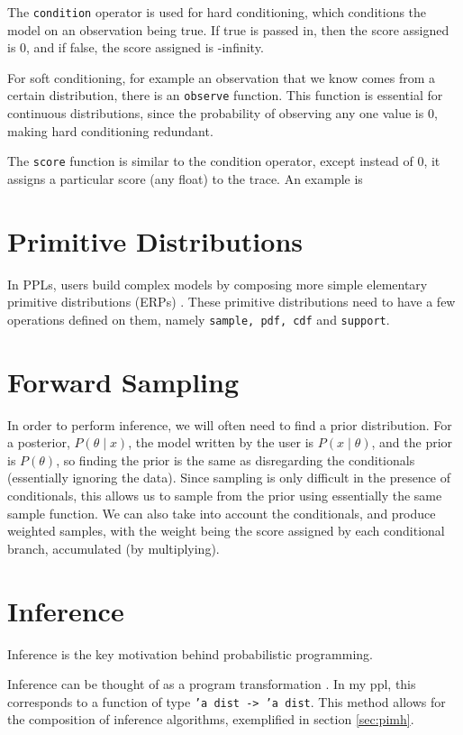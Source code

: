 The \texttt{condition} operator is used for hard conditioning, which conditions the model on an observation being true. If true is passed in, then the score assigned is 0, and if false, the score assigned is -infinity.

For soft conditioning, for example an observation that we know comes from a certain distribution, there is an \texttt{observe} function. This function is essential for continuous distributions, since the probability of observing any one value is 0, making hard conditioning redundant.

The \texttt{score} function is similar to the condition operator, except instead of 0, it assigns a particular score (any float) to the trace. An example is %

\section{Primitive Distributions}
In PPLs, users build complex models by composing more simple elementary primitive distributions (ERPs) \cite{pmlr-v15-wingate11a}. These primitive distributions need to have a few operations defined on them, namely \texttt{sample, pdf, cdf} and \texttt{support}.

\section{Forward Sampling}

In order to perform inference, we will often need to find a prior distribution. For a posterior, $P(\theta\mid x)$, the model written by the user is $P(x\mid\theta)$, and the prior is $P(\theta)$, so finding the prior is the same as disregarding the conditionals (essentially ignoring the data). Since sampling is only difficult in the presence of conditionals, this allows us to sample from the prior using essentially the same sample function. We can also take into account the conditionals, and produce weighted samples, with the weight being the score assigned by each conditional branch, accumulated (by multiplying).

\section{Inference}

Inference is the key motivation behind probabilistic programming. 

Inference can be thought of as a program transformation \cite{scibior2015practical} \cite{Zinkov2016ComposingIA}. In my ppl, this corresponds to a function of type \texttt{'a dist -> 'a dist}. This method allows for the composition of inference algorithms, exemplified in section \ref{sec:pimh}.

